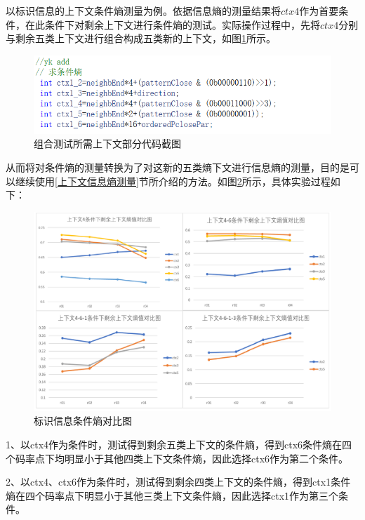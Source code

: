 \documentclass[bachelor,print,msfonts]{xduthesis}
\begin{document}
以标识信息的上下文条件熵测量为例。依据信息熵的测量结果将$ctx4$作为首要条件，在此条件下对剩余上下文进行条件熵的测试。实际操作过程中，先将$ctx4$分别与剩余五类上下文进行组合构成五类新的上下文，如图\ref{上下文新组合}所示。

\begin{figure}[h]
    \centering
    \includegraphics[scale=0.4]{image/上下文新组合.png}
    \caption{组合测试所需上下文部分代码截图}
    \label{上下文新组合}
\end{figure}

从而将对条件熵的测量转换为了对这新的五类熵下文进行信息熵的测量，目的是可以继续使用\ref{上下文信息熵测量}节所介绍的方法。如图\ref{标识信息条件熵}所示，具体实验过程如下：
\begin{figure}[h]
    \centering
    \includegraphics[scale=0.5]{image/标识信息条件熵.pdf}
    \caption{标识信息条件熵对比图}
    \label{标识信息条件熵}
\end{figure}

1、以ctx4作为条件时，测试得到剩余五类上下文的条件熵，得到ctx6条件熵在四个码率点下均明显小于其他四类上下文条件熵，因此选择ctx6作为第二个条件。

2、以ctx4、ctx6作为条件时，测试得到剩余四类上下文的条件熵，得到ctx1条件熵在四个码率点下明显小于其他三类上下文条件熵，因此选择ctx1作为第三个条件。
\end{document}
